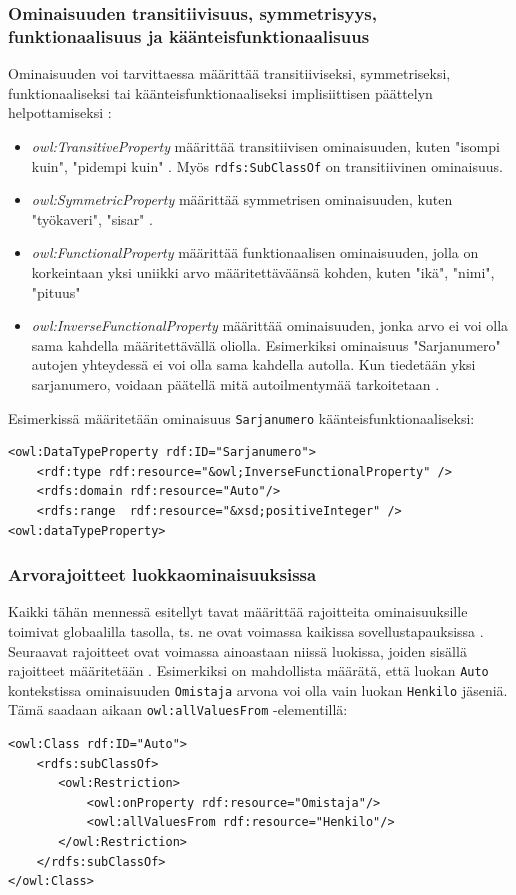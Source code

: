 \documentclass[finnish]{tktltiki2}
\theoremstyle{definition}
\theoremstyle{remark}
\begin{document}
\subsubsection{Ominaisuuden transitiivisuus, symmetrisyys, funktionaalisuus ja käänteisfunktionaalisuus}
Ominaisuuden voi tarvittaessa määrittää transitiiviseksi, symmetriseksi, funktionaaliseksi tai käänteisfunktionaaliseksi implisiittisen päättelyn helpottamiseksi \cite{AH09}:

\begin{itemize}
 \item \textit{owl:TransitiveProperty} määrittää transitiivisen ominaisuuden, kuten "isompi kuin", "pidempi kuin" \cite{AH09}. Myös \texttt{rdfs:SubClassOf} on transitiivinen ominaisuus. 
 \item \textit{owl:SymmetricProperty} määrittää symmetrisen ominaisuuden, kuten "työkaveri", "sisar" \cite{AH09}.
 \item \textit{owl:FunctionalProperty} määrittää funktionaalisen ominaisuuden, jolla on korkeintaan yksi uniikki arvo määritettäväänsä kohden, kuten "ikä", "nimi", "pituus" \cite{AH09}
 \item \textit{owl:InverseFunctionalProperty} määrittää ominaisuuden, jonka arvo ei voi olla sama kahdella määritettävällä oliolla. Esimerkiksi ominaisuus "Sarjanumero" autojen yhteydessä ei voi olla sama kahdella autolla. Kun tiedetään yksi sarjanumero, voidaan päätellä mitä autoilmentymää tarkoitetaan \cite{AH09}.
\end{itemize}
Esimerkissä määritetään ominaisuus \texttt{Sarjanumero} käänteisfunktionaaliseksi:
\begin{verbatim}
<owl:DataTypeProperty rdf:ID="Sarjanumero">
    <rdf:type rdf:resource="&owl;InverseFunctionalProperty" />
    <rdfs:domain rdf:resource="Auto"/>
    <rdfs:range  rdf:resource="&xsd;positiveInteger" />   
<owl:dataTypeProperty>
\end{verbatim}

\subsubsection{Arvorajoitteet luokkaominaisuuksissa}
Kaikki tähän mennessä esitellyt tavat määrittää rajoitteita ominaisuuksille toimivat globaalilla tasolla, ts. ne ovat voimassa kaikissa sovellustapauksissa \cite{SWM04}. Seuraavat rajoitteet ovat voimassa ainoastaan niissä luokissa, joiden sisällä rajoitteet määritetään \cite{SWM04}. Esimerkiksi on mahdollista määrätä, että luokan \texttt{Auto} kontekstissa ominaisuuden \texttt{Omistaja} arvona voi olla vain luokan \texttt{Henkilo} jäseniä. Tämä saadaan aikaan \texttt{owl:allValuesFrom} -elementillä:
\begin{verbatim}
<owl:Class rdf:ID="Auto">
    <rdfs:subClassOf>
       <owl:Restriction>
           <owl:onProperty rdf:resource="Omistaja"/>
           <owl:allValuesFrom rdf:resource="Henkilo"/>
       </owl:Restriction>        
    </rdfs:subClassOf>
</owl:Class>    
\end{verbatim}
\end{document}
